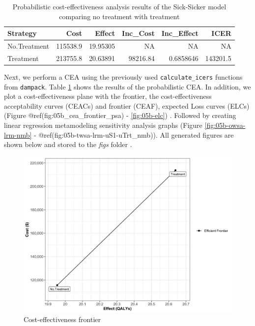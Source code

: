 \documentclass[]{book}
\begin{document}
\begin{table}[t]

\caption{\label{tab:df-cea-prob}Probabilistic cost-effectiveness analysis results of the Sick-Sicker model comparing no treatment with treatment}
\centering
\begin{tabular}{l|r|r|r|r|r}
\hline
Strategy & Cost & Effect & Inc\_Cost & Inc\_Effect & ICER\\
\hline
No.Treatment & 115538.9 & 19.95305 & NA & NA & NA\\
\hline
Treatment & 213755.8 & 20.63891 & 98216.84 & 0.6858646 & 143201.5\\
\hline
\end{tabular}
\end{table}

Next, we perform a CEA using the previously used
\texttt{calculate\_icers} functions from \texttt{dampack}. Table
\ref{tab:df-cea-prob} shows the results of the probabilistic CEA. In
addition, we plot a cost-effectiveness plane with the frontier, the
cost-effectiveness acceptability curves (CEACs) and frontier (CEAF),
expected Loss curves (ELCs) (Figure @ref(fig:05b\_cea\_frontier\_psa) -
\ref{fig:05b-elc}) \citep{Alarid-Escudero2019}. Followed by creating
linear regression metamodeling sensitivity analysis graphs (Figure
\ref{fig:05b-owsa-lrm-nmb} -
@ref(fig:05b-twsa-lrm-uS1-uTrt\_nmb))\citep{Jalal2013}. All generated
figures are shown below and stored to the \emph{figs} folder .

\begin{figure}

{\centering \includegraphics[width=33.33in]{../figs/05b_cea_frontier_psa} 

}

\caption{Cost-effectiveness frontier}\label{fig:05b-cea-frontier-psa}
\end{figure}
\end{document}
